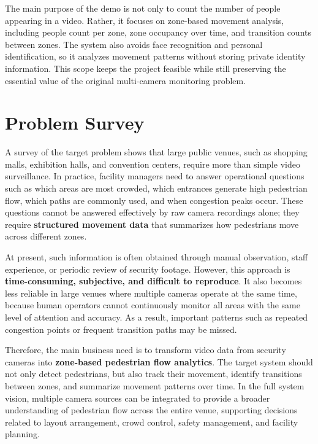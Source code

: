 \documentclass[12pt,a4paper]{report}
\begin{document}
The main purpose of the demo is not only to count the number of people appearing in a video. 
Rather, it focuses on zone-based movement analysis, including people count per zone, zone occupancy over time, and transition counts between zones. 
The system also avoids face recognition and personal identification, so it analyzes movement patterns without storing private identity information. 
This scope keeps the project feasible while still preserving the essential value of the original multi-camera monitoring problem.

\section{Problem Survey}
\label{sec:problem-survey}

A survey of the target problem shows that large public venues, such as shopping malls, exhibition halls, and convention centers, require more than simple video surveillance. 
In practice, facility managers need to answer operational questions such as which areas are most crowded, which entrances generate high pedestrian flow, which paths are commonly used, and when congestion peaks occur. 
These questions cannot be answered effectively by raw camera recordings alone; they require \textbf{structured movement data} that summarizes how pedestrians move across different zones.

At present, such information is often obtained through manual observation, staff experience, or periodic review of security footage. 
However, this approach is \textbf{time-consuming, subjective, and difficult to reproduce}. 
It also becomes less reliable in large venues where multiple cameras operate at the same time, because human operators cannot continuously monitor all areas with the same level of attention and accuracy. 
As a result, important patterns such as repeated congestion points or frequent transition paths may be missed.

Therefore, the main business need is to transform video data from security cameras into \textbf{zone-based pedestrian flow analytics}. 
The target system should not only detect pedestrians, but also track their movement, identify transitions between zones, and summarize movement patterns over time. 
In the full system vision, multiple camera sources can be integrated to provide a broader understanding of pedestrian flow across the entire venue, supporting decisions related to layout arrangement, crowd control, safety management, and facility planning.
\end{document}
